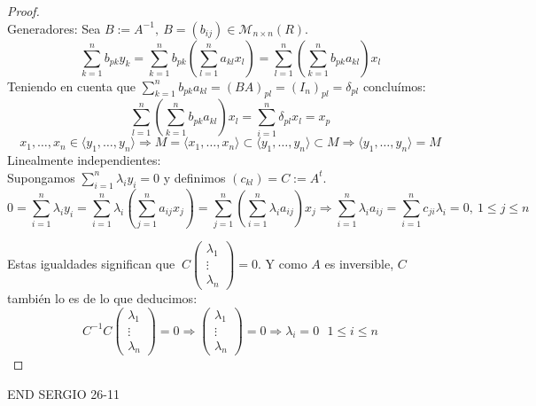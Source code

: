 \documentclass{article}
\theoremstyle{theorem-style}  %
\theoremstyle{definition}
\theoremstyle{example-style}
\begin{document}
	\begin{proof}\ \\
		Generadores: Sea $B:=A^{-1},\ B=(b_{ij})\in \mathcal{M}_{n\times n}(R)$.
		\[\sum_{k=1}^nb_{pk}y_k=\sum_{k=1}^nb_{pk}(\sum_{l=1}^na_{kl}x_l)=\sum_{l=1}^n(\sum_{k=1}^nb_{pk}a_{kl})x_l\]
		Teniendo en cuenta que $\sum_{k=1}^nb_{pk}a_{kl}=(BA)_{pl}=(I_n)_{pl}=\delta_{pl}$ concluímos:
		\[\sum_{l=1}^n(\sum_{k=1}^nb_{pk}a_{kl})x_l=\sum_{i=1}^n\delta_{pl}x_l=x_p\]
		\[x_1,\dots,x_n \in \langle y_1,\dots, y_n \rangle \Rightarrow M=\langle x_1,\dots,x_n \rangle \subset \langle y_1,\dots,y_n \rangle \subset M \Rightarrow \langle y_1,\dots,y_n \rangle = M\]
		Linealmente independientes:\\
		Supongamos $\sum_{i=1}^n\lambda_iy_i=0$ y definimos $(c_{kl})=C:=A^t$.
		\[0=\sum_{i=1}^n\lambda_iy_i=\sum_{i=1}^n\lambda_i(\sum_{j=1}^na_{ij}x_j)=\sum_{j=1}^n(\sum_{i=1}^n\lambda_ia_{ij})x_j \Rightarrow \sum_{i=1}^n\lambda_ia_{ij}=\sum_{i=1}^nc_{ji}\lambda_i=0,\ 1\leq j\leq n\]

		Estas igualdades significan que $\ C\begin{pmatrix} \lambda_1 \\ \vdots \\ \lambda_n \end{pmatrix}=0$. Y como $A$ es inversible, $C$ también lo es de lo que deducimos:
		\[C^{-1}C\begin{pmatrix} \lambda_1 \\ \vdots \\ \lambda_n \end{pmatrix}=0 \Rightarrow \begin{pmatrix} \lambda_1 \\ \vdots \\ \lambda_n \end{pmatrix}=0 \Rightarrow \lambda_i=0 \ \ \  1\leq i \leq n\]
	\end{proof}

	END SERGIO 26-11
\end{document}
